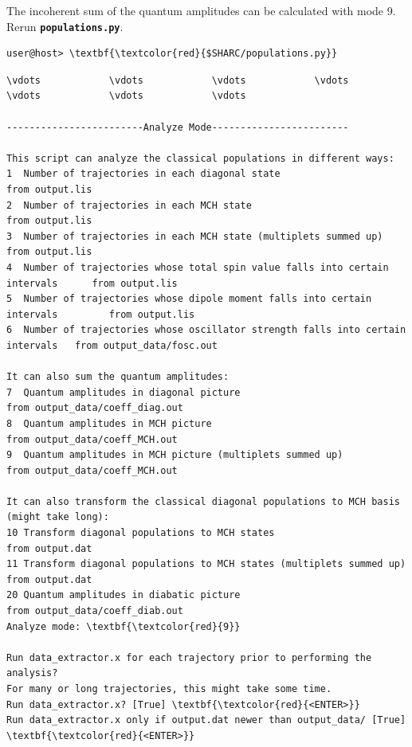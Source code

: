 \documentclass[a4paper,11pt,DIV=15,openany]{scrbook}
\newcommand{\ttt}[1]{\textbf{\texttt{#1}}}
\begin{document}
\normalsize
The incoherent sum of the quantum amplitudes can be calculated with mode 9. Rerun \ttt{populations.py}.
\begin{Verbatim}[commandchars=\\\{\}]
user@host> \textbf{\textcolor{red}{$SHARC/populations.py}}
\end{Verbatim}

\begin{oframed}
\footnotesize\begin{Verbatim}[commandchars=\\\{\}]
\vdots            \vdots            \vdots            \vdots            \vdots            \vdots            \vdots            

------------------------Analyze Mode------------------------

This script can analyze the classical populations in different ways:
1  Number of trajectories in each diagonal state                                   from output.lis
2  Number of trajectories in each MCH state                                        from output.lis
3  Number of trajectories in each MCH state (multiplets summed up)                 from output.lis
4  Number of trajectories whose total spin value falls into certain intervals      from output.lis
5  Number of trajectories whose dipole moment falls into certain intervals         from output.lis
6  Number of trajectories whose oscillator strength falls into certain intervals   from output_data/fosc.out

It can also sum the quantum amplitudes:
7  Quantum amplitudes in diagonal picture                                    from output_data/coeff_diag.out
8  Quantum amplitudes in MCH picture                                         from output_data/coeff_MCH.out
9  Quantum amplitudes in MCH picture (multiplets summed up)                  from output_data/coeff_MCH.out

It can also transform the classical diagonal populations to MCH basis (might take long):
10 Transform diagonal populations to MCH states                              from output.dat
11 Transform diagonal populations to MCH states (multiplets summed up)       from output.dat
20 Quantum amplitudes in diabatic picture                                    from output_data/coeff_diab.out
Analyze mode: \textbf{\textcolor{red}{9}}

Run data_extractor.x for each trajectory prior to performing the analysis?
For many or long trajectories, this might take some time.
Run data_extractor.x? [True] \textbf{\textcolor{red}{<ENTER>}}
Run data_extractor.x only if output.dat newer than output_data/ [True] \textbf{\textcolor{red}{<ENTER>}}


\end{Verbatim}
\end{oframed}
\end{document}
